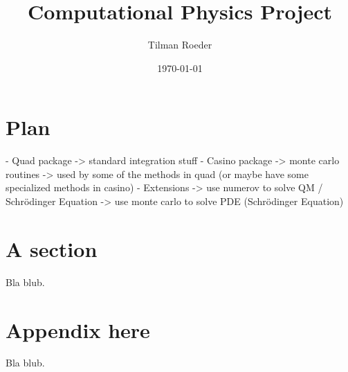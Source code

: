 \documentclass[10pt, a4paper]{article}
\title{Computational Physics Project}
\author{Tilman Roeder}
\date{\today}
\begin{document}
\maketitle

\section{Plan}
- Quad package -> standard integration stuff
- Casino package -> monte carlo routines
  -> used by some of the methods in quad (or maybe have some specialized methods in casino)
- Extensions
  -> use numerov to solve QM / Schrödinger Equation
  -> use monte carlo to solve PDE (Schrödinger Equation)

\section{A section}
Bla blub.

{}


\appendix{}

\section{Appendix here}
Bla blub.
\end{document}
